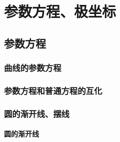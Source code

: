 \chapter{参数方程、极坐标}
\section{参数方程}
\subsection{曲线的参数方程}
\begin{Practice}
  \begin{question}
    \item 
    \item 
  \end{question}
\end{Practice}
\subsection{参数方程和普通方程的互化}
\begin{Practice}
  \begin{question}
    \item 
    \item 
  \end{question}
\end{Practice}
\subsection{圆的渐开线、摆线}

\subsubsection{圆的渐开线}
\begin{Practice}
  \begin{question}
    \item 
    \item 
  \end{question}
\end{Practice}
